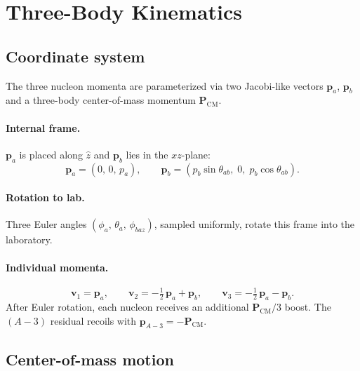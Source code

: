 \documentclass[11pt,a4paper]{article}
\newcommand{\vect}[1]{\bm{#1}}
\begin{document}
\section{Three-Body Kinematics}

\subsection{Coordinate system}

The three nucleon momenta are parameterized via two Jacobi-like vectors
$\vect{p}_{a}$, $\vect{p}_{b}$ and a three-body center-of-mass momentum
$\vect{P}_{\text{CM}}$.

\paragraph{Internal frame.}
$\vect{p}_{a}$ is placed along $\hat{z}$ and $\vect{p}_{b}$ lies in the
$xz$-plane:
\begin{equation}
  \vect{p}_{a} = (0,\,0,\,p_{a}), \qquad
  \vect{p}_{b} = (p_{b}\sin\theta_{ab},\;0,\;p_{b}\cos\theta_{ab}).
\end{equation}

\paragraph{Rotation to lab.}
Three Euler angles $(\phi_{a},\,\theta_{a},\,\phi_{baz})$, sampled uniformly,
rotate this frame into the laboratory.

\paragraph{Individual momenta.}
\begin{equation}
  \vect{v}_{1} = \vect{p}_{a},
  \qquad
  \vect{v}_{2} = -\tfrac{1}{2}\,\vect{p}_{a} + \vect{p}_{b},
  \qquad
  \vect{v}_{3} = -\tfrac{1}{2}\,\vect{p}_{a} - \vect{p}_{b}.
\end{equation}
After Euler rotation, each nucleon receives an additional
$\vect{P}_{\text{CM}}/3$ boost.  The $(A{-}3)$ residual recoils with
$\vect{p}_{A{-}3} = -\vect{P}_{\text{CM}}$.

\subsection{Center-of-mass motion}
\end{document}
